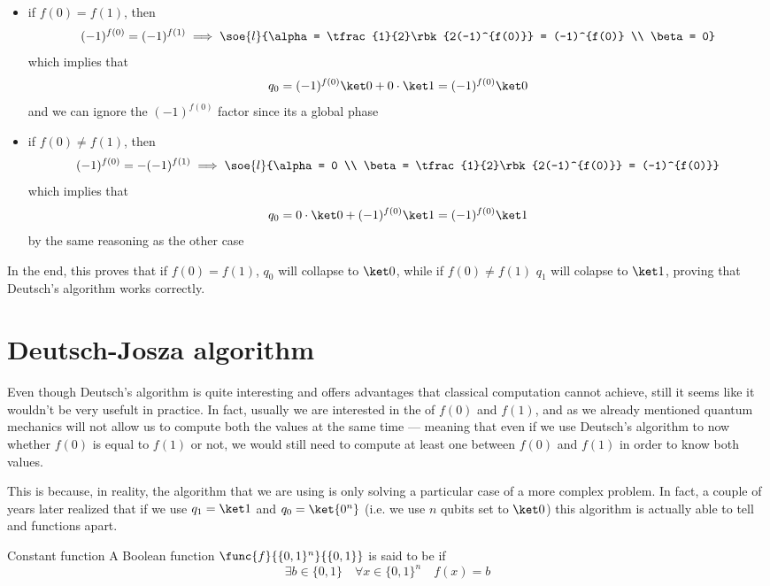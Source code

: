 \documentclass[a4paper, 12pt]{report}
\begin{document}
\begin{itemize}
    \item if $f(0) = f(1)$, then $$(-1)^{f(0)} = (-1)^{f(1)} \implies \soe{l}{\alpha = \tfrac{1}{2}\rbk{2(-1)^{f(0)}} = (-1)^{f(0)} \\ \beta = 0}$$ which implies that $$q_0 = (-1)^{f(0)} \ket 0 + 0 \cdot \ket 1 = (-1)^{f(0)} \ket 0$$ and we can ignore the $(-1)^{f(0)}$ factor since its a global phase
    \item if $f(0) \neq f(1)$, then $$(-1)^{f(0)} = - (-1)^{f(1)} \implies \soe{l}{\alpha = 0 \\ \beta = \tfrac{1}{2}\rbk{2(-1)^{f(0)}} = (-1)^{f(0)}}$$ which implies that $$q_0 = 0 \cdot \ket 0 + (-1)^{f(0)} \ket 1 = (-1)^{f(0)} \ket 1$$ by the same reasoning as the other case
\end{itemize}

In the end, this proves that if $f(0) = f(1)$, $q_0$ will collapse to $\ket 0$, while if $f(0) \neq f(1)$ $q_1$ will colapse to $\ket 1$, proving that Deutsch's algorithm works correctly.

\section{Deutsch-Josza algorithm}

Even though Deutsch's algorithm is quite interesting and offers advantages that classical computation cannot achieve, still it seems like it wouldn't be very usefult in practice. In fact, usually we are interested in the  of $f(0)$ and $f(1)$, and as we already mentioned quantum mechanics will not allow us to compute both the values at the same time --- meaning that even if we use Deutsch's algorithm to now whether $f(0)$ is equal to $f(1)$ or not, we would still need to compute at least one between $f(0)$ and $f(1)$ in order to know both values.

This is because, in reality, the algorithm that we are using is only solving a particular case of a more complex problem. In fact, a couple of years later \textcite{dj} realized that if we use $q_1 = \ket 1$ and $q_0 = \ket{0^n}$ (i.e. we use $n$ qubits set to $\ket 0$) this algorithm is actually able to tell  and  functions apart.

\begin{frameddefn}{Constant function}
    A Boolean function $\func{f}{\{0, 1\}^n}{\{0,1\}}$ is said to be  if $$\exists b \in \{0, 1\} \quad \forall x \in \{0, 1\}^n \quad f(x) = b$$
\end{frameddefn}
\end{document}
